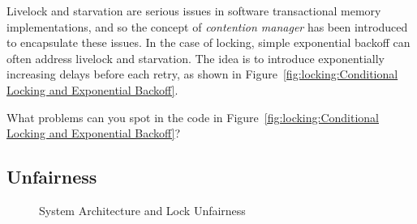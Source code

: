 Livelock and starvation are serious issues in software transactional
memory implementations, and so the concept of \emph{contention
manager} has been introduced to encapsulate these issues.
In the case of locking, simple exponential backoff can often address
livelock and starvation.
The idea is to introduce exponentially increasing delays before each
retry, as shown in
Figure~\ref{fig:locking:Conditional Locking and Exponential Backoff}.

\QuickQuiz{}
	What problems can you spot in the code in
	Figure~\ref{fig:locking:Conditional Locking and Exponential Backoff}?
 \QuickQuizEnd

\subsection{Unfairness}
\label{sec:locking:Unfairness}

\begin{figure}[tb]
\begin{center}
\end{center}
\caption{System Architecture and Lock Unfairness}
\label{fig:lock:System Architecture and Lock Unfairness}
\end{figure}

